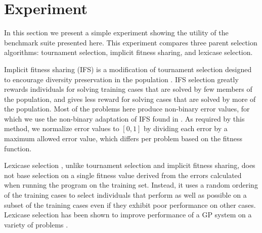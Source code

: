 \documentclass{sig-alternate}
\begin{document}
\section{Experiment}


In this section we present a simple experiment showing the utility of the benchmark suite presented here. This experiment compares three parent selection algorithms: tournament selection, implicit fitness sharing, and lexicase selection.

Implicit fitness sharing (IFS) is a modification of tournament selection designed to encourage diversity preservation in the population \cite{McKay:2000:GECCO}. IFS selection greatly rewards individuals for solving training cases that are solved by few members of the population, and gives less reward for solving cases that are solved by more of the population. Most of the problems here produce non-binary error values, for which we use the non-binary adaptation of IFS found in \cite{Krawiec:2013:EvoIASP}. As required by this method, we normalize error values to $[0, 1]$ by dividing each error by a maximum allowed error value, which differs per problem based on the fitness function.

Lexicase selection \cite{Helmuth:2014:ieeeTEC}, %
 unlike tournament selection and implicit fitness sharing, does not base selection on a single fitness value derived from the errors calculated when running the program on the training set. Instead, it uses a random ordering of the training cases to select individuals that perform as well as possible on a subset of the training cases even if they exhibit poor performance on other cases. Lexicase selection has been shown to improve performance of a GP system on a variety of problems \cite{Helmuth:2014:ieeeTEC, Helmuth:2014:GECCO}. %
\end{document}
